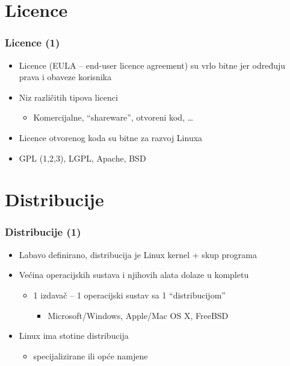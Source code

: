 \documentclass{beamer}
\begin{document}
\section{Licence}
\begin{frame}[t]
\frametitle{Licence (1)}
\begin{itemize}
  \item Licence (EULA -- end-user licence agreement) su vrlo bitne jer
        određuju prava i obaveze korisnika
  \item Niz različitih tipova licenci
  \begin{itemize}
    \item Komercijalne, ``shareware'', otvoreni kod, \ldots
  \end{itemize}
  \item Licence otvorenog koda su bitne za razvoj Linuxa
  \item GPL (1,2,3), LGPL, Apache, BSD
\end{itemize}
\end{frame}

\section{Distribucije}
\begin{frame}[t]
\frametitle{Distribucije (1)}
\begin{itemize}
  \item Labavo definirano, distribucija je Linux kernel + skup programa
  \item Većina operacijskih sustava i njihovih alata dolaze u kompletu
  \begin{itemize}
    \item 1 izdavač -- 1 operacijski sustav sa 1 ``distribucijom''
    \begin{itemize}
      \item Microsoft/Windows, Apple/Mac OS X, FreeBSD
    \end{itemize}
  \end{itemize}
  \item Linux ima stotine distribucija
  \begin{itemize}
    \item specijalizirane ili opće namjene
  \end{itemize}
\end{itemize}
\end{frame}
\end{document}
